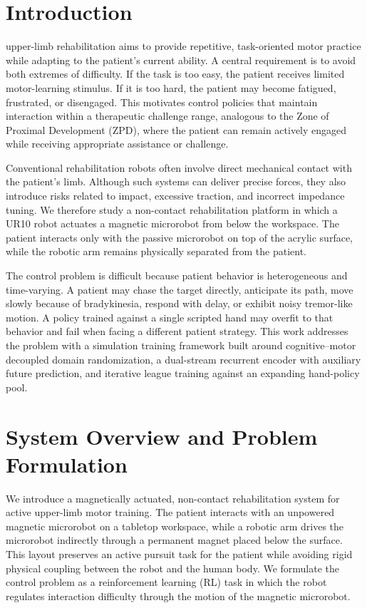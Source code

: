 \documentclass[lettersize,journal]{IEEEtran}
\begin{document}
\section{Introduction}
 upper-limb rehabilitation aims to provide repetitive, task-oriented motor practice while adapting to the patient's current ability. A central requirement is to avoid both extremes of difficulty. If the task is too easy, the patient receives limited motor-learning stimulus. If it is too hard, the patient may become fatigued, frustrated, or disengaged. This motivates control policies that maintain interaction within a therapeutic challenge range, analogous to the Zone of Proximal Development (ZPD), where the patient can remain actively engaged while receiving appropriate assistance or challenge.

Conventional rehabilitation robots often involve direct mechanical contact with the patient's limb. Although such systems can deliver precise forces, they also introduce risks related to impact, excessive traction, and incorrect impedance tuning. We therefore study a non-contact rehabilitation platform in which a UR10 robot actuates a magnetic microrobot from below the workspace. The patient interacts only with the passive microrobot on top of the acrylic surface, while the robotic arm remains physically separated from the patient.

The control problem is difficult because patient behavior is heterogeneous and time-varying. A patient may chase the target directly, anticipate its path, move slowly because of bradykinesia, respond with delay, or exhibit noisy tremor-like motion. A policy trained against a single scripted hand may overfit to that behavior and fail when facing a different patient strategy. This work addresses the problem with a simulation training framework built around cognitive--motor decoupled domain randomization, a dual-stream recurrent encoder with auxiliary future prediction, and iterative league training against an expanding hand-policy pool.

\section{System Overview and Problem Formulation}
We introduce a magnetically actuated, non-contact rehabilitation system for active upper-limb motor training. The patient interacts with an unpowered magnetic microrobot on a tabletop workspace, while a robotic arm drives the microrobot indirectly through a permanent magnet placed below the surface. This layout preserves an active pursuit task for the patient while avoiding rigid physical coupling between the robot and the human body. We formulate the control problem as a reinforcement learning (RL) task in which the robot regulates interaction difficulty through the motion of the magnetic microrobot.
\end{document}

